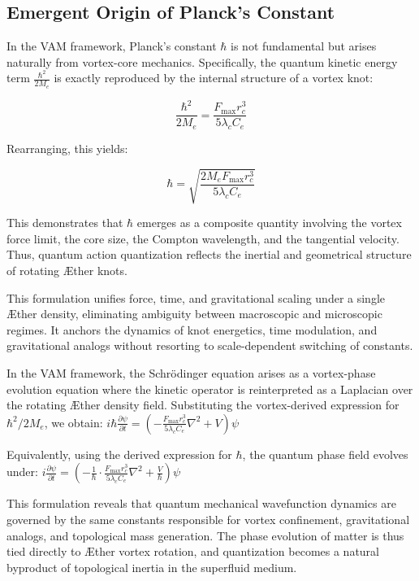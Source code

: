\subsection*{Emergent Origin of Planck's Constant}

In the VAM framework, Planck's constant $\hbar$ is not fundamental but arises naturally from vortex-core mechanics. Specifically, the quantum kinetic energy term $\frac{\hbar^2}{2M_e}$ is exactly reproduced by the internal structure of a vortex knot:

\[
\frac{\hbar^2}{2M_e} = \frac{F_{\text{max}} r_c^3}{5 \lambda_c C_e}
\]

Rearranging, this yields:

\[
\hbar = \sqrt{ \frac{2M_e F_{\text{max}} r_c^3}{5 \lambda_c C_e} }
\]

This demonstrates that $\hbar$ emerges as a composite quantity involving the vortex force limit, the core size, the Compton wavelength, and the tangential velocity. Thus, quantum action quantization reflects the inertial and geometrical structure of rotating Æther knots.

This formulation unifies force, time, and gravitational scaling under a single Æther density, eliminating ambiguity between macroscopic and microscopic regimes. It anchors the dynamics of knot energetics, time modulation, and gravitational analogs without resorting to scale-dependent switching of constants.

In the VAM framework, the Schrödinger equation arises as a vortex-phase evolution equation where the kinetic operator is reinterpreted as a Laplacian over the rotating Æther density field. Substituting the vortex-derived expression for $\hbar^2 / 2 M_e$, we obtain:
$ i \hbar \frac{\partial \psi}{\partial t} = \left( -\frac{F_{\max} r_c^3}{5 \lambda_c C_e} \nabla^2 + V \right)\psi $

Equivalently, using the derived expression for $\hbar$, the quantum phase field evolves under:
$ i \frac{\partial \psi}{\partial t} = \left( - \frac{1}{\hbar} \cdot \frac{F_{\max} r_c^3}{5 \lambda_c C_e} \nabla^2 + \frac{V}{\hbar} \right)\psi $

This formulation reveals that quantum mechanical wavefunction dynamics are governed by the same constants responsible for vortex confinement, gravitational analogs, and topological mass generation. The phase evolution of matter is thus tied directly to Æther vortex rotation, and quantization becomes a natural byproduct of topological inertia in the superfluid medium.

